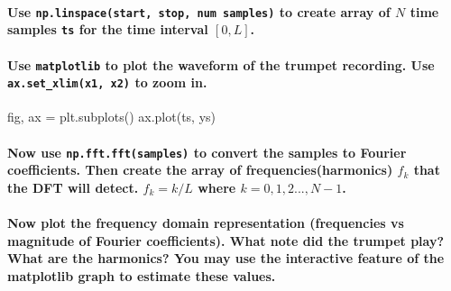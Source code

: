 \documentclass[11pt]{article}
\newenvironment{Shaded}{}{}
\newcommand{\NormalTok}[1]{{#1}}
\newcommand{\OperatorTok}[1]{\textcolor[rgb]{0.40,0.40,0.40}{{#1}}}
\begin{document}
    \paragraph{\texorpdfstring{Use
\texttt{np.linspace(start,\ stop,\ num\ samples)} to create array of
\(N\) time samples \texttt{ts} for the time interval
\([0,L]\).}{Use np.linspace(start, stop, num samples) to create array of N time samples ts for the time interval {[}0,L{]}.}}\label{use-np.linspacestart-stop-num-samples-to-create-array-of-n-time-samples-ts-for-the-time-interval-0l.}

    \paragraph{\texorpdfstring{Use \texttt{matplotlib} to plot the waveform
of the trumpet recording. Use \texttt{ax.set\_xlim(x1,\ x2)} to zoom
in.}{Use matplotlib to plot the waveform of the trumpet recording. Use ax.set\_xlim(x1, x2) to zoom in.}}\label{use-matplotlib-to-plot-the-waveform-of-the-trumpet-recording.-use-ax.set_xlimx1-x2-to-zoom-in.}

\begin{Shaded}
\begin{Highlighting}[]
\NormalTok{fig, ax }\OperatorTok{=}\NormalTok{ plt.subplots()}
\NormalTok{ax.plot(ts, ys)}
\end{Highlighting}
\end{Shaded}

    \paragraph{\texorpdfstring{Now use \texttt{np.fft.fft(samples)} to
convert the samples to Fourier coefficients. Then create the array of
frequencies(harmonics) \(f_k\) that the DFT will detect. \(f_k=k/L\)
where
\(k = 0,1,2...,N-1\).}{Now use np.fft.fft(samples) to convert the samples to Fourier coefficients. Then create the array of frequencies(harmonics) f\_k that the DFT will detect. f\_k=k/L where k = 0,1,2...,N-1.}}\label{now-use-np.fft.fftsamples-to-convert-the-samples-to-fourier-coefficients.-then-create-the-array-of-frequenciesharmonics-f_k-that-the-dft-will-detect.-f_kkl-where-k-012...n-1.}

    \paragraph{Now plot the frequency domain representation (frequencies vs
magnitude of Fourier coefficients). What note did the trumpet play? What
are the harmonics? You may use the interactive feature of the matplotlib
graph to estimate these
values.}\label{now-plot-the-frequency-domain-representation-frequencies-vs-magnitude-of-fourier-coefficients.-what-note-did-the-trumpet-play-what-are-the-harmonics-you-may-use-the-interactive-feature-of-the-matplotlib-graph-to-estimate-these-values.}
\end{document}
